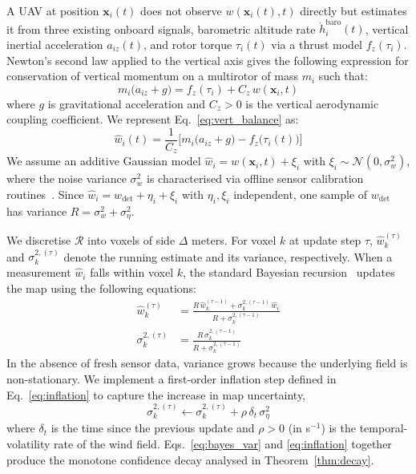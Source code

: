 \documentclass[conference]{IEEEtran}
\newcommand{\rd}[1]{#1}   %
\newcommand{\rdisp}{}     %
\newcommand{\wdet}{w_{\mathrm{det}}}
\begin{document}
A UAV at position $\mathbf{x}_i(t)$ does not observe
$w(\mathbf{x}_i(t),t)$ directly but estimates it from three existing onboard
signals, barometric altitude rate $\dot{h}_i^{\text{baro}}(t)$, vertical
inertial acceleration $a_{iz}(t)$, and rotor torque $\tau_i(t)$ via a
thrust model $f_z(\tau_i)$. Newton's second law applied to the vertical axis gives the following expression for conservation of vertical momentum
on a multirotor of mass $m_i$ such that:
\begin{equation}
m_i\bigl(a_{iz}+g\bigr) = f_z(\tau_i) + C_z\,w(\mathbf{x}_i,t)
\label{eq:vert_balance}
\end{equation}
where $g$ is gravitational acceleration and $C_z>0$ is the vertical
aerodynamic coupling coefficient. We represent Eq.~\eqref{eq:vert_balance} as:
\begin{equation}
\hat{w}_i(t) = \frac{1}{C_z} \Big[ m_i \bigl(a_{iz} + g \bigr) - f_z \bigl(\tau_i(t) \bigr) \Big]
\label{eq:w_estimator}
\end{equation}
We assume an additive Gaussian model $\hat{w}_i=w(\mathbf{x}_i,t)+\xi_i$ with
$\xi_i\sim\mathcal{N}(0,\sigma_w^2)$, where the noise variance $\sigma_w^2$ is characterised
via offline sensor calibration routines~\cite{thrun}. \rd{Since $\hat{w}_i=\wdet+\eta_i+\xi_i$ with $\eta_i,\xi_i$ independent, one sample of $\wdet$ has variance $R=\sigma_w^2+\sigma_\eta^2$.}

We discretise $\mathcal{R}$ into voxels of side \rd{$\Delta$} meters. For voxel $k$
at update step $\tau$, $\hat{w}_k^{(\tau)}$ and $\sigma_k^{2,(\tau)}$ denote the running estimate
and its variance, respectively. When a measurement $\hat{w}_i$ falls
within voxel $k$, the standard Bayesian recursion~\cite{lawrance} updates
the map using the following equations:
\begin{align}
\hat{w}_k^{(\tau)} &=
\frac{\rdisp R\,\hat{w}_k^{(\tau-1)}
      + \sigma_k^{2,(\tau-1)}\,\hat{w}_i}
     {\rdisp R+\sigma_k^{2,(\tau-1)}}
\label{eq:bayes_mean}\\
\sigma_k^{2,(\tau)} &=
\frac{\rdisp R\,\sigma_k^{2,(\tau-1)}}
     {\rdisp R+\sigma_k^{2,(\tau-1)}}
\label{eq:bayes_var}
\end{align}
In the absence of fresh sensor data, variance grows because the
underlying field is non-stationary. We implement a first-order
inflation step defined in Eq.~\eqref{eq:inflation} to capture the increase in map uncertainty,
\begin{equation}
\sigma_k^{2,(\tau)} \leftarrow \sigma_k^{2,(\tau)}
   + \rho\,\delta_t\,\sigma_\eta^2
\label{eq:inflation}
\end{equation}
where \rd{$\delta_t$ is the time since the previous update and} $\rho>0$ \rd{(in s$^{-1}$)} is the temporal-volatility rate of the wind field.
Eqs.~\eqref{eq:bayes_var} and \eqref{eq:inflation} together produce the \rd{monotone} confidence
decay analysed in Theorem~\ref{thm:decay}.
\end{document}
